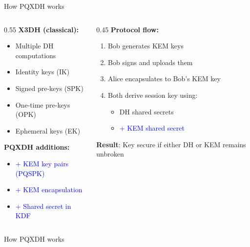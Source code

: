 \ifdefined\PRESENTATION\else\PassOptionsToClass{handout}{beamer}\fi\documentclass[aspectratio=169, lualatex]{beamer}
\begin{document}
\begin{frame}{How PQXDH works}
	\begin{columns}[c]
		\begin{column}{0.55\textwidth}
			\textbf{X3DH (classical):}
			\begin{itemize}
				\item Multiple DH computations
				\item Identity keys (IK)
				\item Signed pre-keys (SPK)
				\item One-time pre-keys (OPK)
				\item Ephemeral keys (EK)
			\end{itemize}
			\textbf{PQXDH additions:}
			\begin{itemize}
				\item \textcolor{blue}{+ KEM key pairs (PQSPK)}
				\item \textcolor{blue}{+ KEM encapsulation}
				\item \textcolor{blue}{+ Shared secret in KDF}
			\end{itemize}
		\end{column}
		\begin{column}{0.45\textwidth}
			\textbf{Protocol flow:}
			\begin{enumerate}
				\item Bob generates KEM keys
				\item Bob signs and uploads them
				\item Alice encapsulates to Bob's KEM key
				\item Both derive session key using:
				      \begin{itemize}
					      \item DH shared secrets
					      \item \textcolor{blue}{+ KEM shared secret}
				      \end{itemize}
			\end{enumerate}
			\textbf{Result}: Key secure if either DH or KEM remains unbroken
		\end{column}
	\end{columns}
\end{frame}

\begin{frame}{How PQXDH works}
\end{frame}
\end{document}
